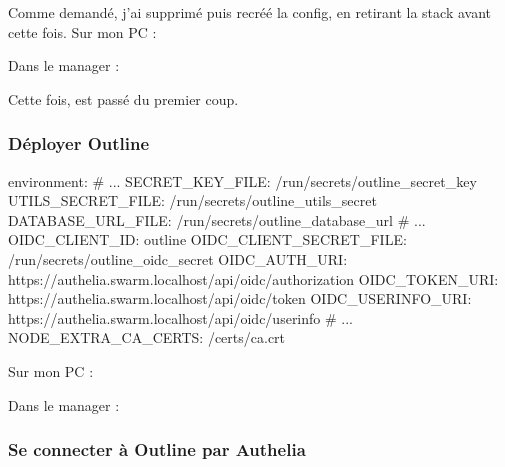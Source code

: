 Comme demandé, j'ai supprimé puis recréé la config, en retirant la stack avant cette fois. Sur mon PC :

\begin{commandes}
\end{commandes}

Dans le manager :

\begin{commandes}
\end{commandes}

Cette fois,  est passé du premier coup.

\subsubsection{Déployer Outline}

\begin{fichier}
    environment:
      # ...
      SECRET_KEY_FILE: /run/secrets/outline_secret_key
      UTILS_SECRET_FILE: /run/secrets/outline_utils_secret
      DATABASE_URL_FILE: /run/secrets/outline_database_url
      # ...
      OIDC_CLIENT_ID: outline
      OIDC_CLIENT_SECRET_FILE: /run/secrets/outline_oidc_secret
      OIDC_AUTH_URI: https://authelia.swarm.localhost/api/oidc/authorization
      OIDC_TOKEN_URI: https://authelia.swarm.localhost/api/oidc/token
      OIDC_USERINFO_URI: https://authelia.swarm.localhost/api/oidc/userinfo
      # ...
      NODE_EXTRA_CA_CERTS: /certs/ca.crt
\end{fichier}

Sur mon PC :

\begin{commandes}
\end{commandes}

Dans le manager :

\begin{commandes}
\end{commandes}


\subsubsection{Se connecter à Outline par Authelia}

